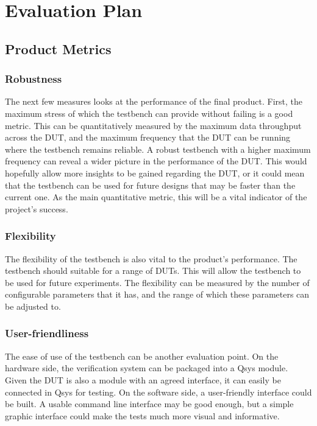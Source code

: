 \section{Evaluation Plan}

\subsection{Product Metrics}
\subsubsection{Robustness}
The next few measures looks at the performance of the final product.
First, the maximum stress of which the testbench can provide without failing is
a good metric.
This can be quantitatively measured by the maximum data throughput across the
DUT, and the maximum frequency that the DUT can be running where the testbench
remains reliable.
A robust testbench with a higher maximum frequency can reveal a wider picture
in the performance of the DUT.
This would hopefully allow more insights to be gained regarding the DUT, or
it could mean that the testbench can be used for future designs that may be
faster than the current one.
As the main quantitative metric, this will be a vital indicator of the
project's success.

\subsubsection{Flexibility}
The flexibility of the testbench is also vital to the product's performance.
The testbench should suitable for a range of DUTs.
This will allow the testbench to be used for future experiments.
The flexibility can be measured by the number of configurable parameters that
it has, and the range of which these parameters can be adjusted to.

\subsubsection{User-friendliness}
The ease of use of the testbench can be another evaluation point.
On the hardware side, the verification system can be packaged into a Qsys
module.
Given the DUT is also a module with an agreed interface, it can easily be
connected in Qsys for testing.
On the software side, a user-friendly interface could be built.
A usable command line interface may be good enough, but a simple graphic
interface could make the tests much more visual and informative.

